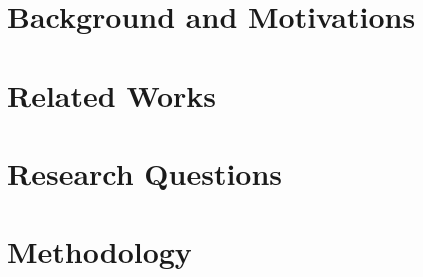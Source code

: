 \documentclass{Configuration_Files/PoliMi3i_thesis}
\begin{document}

\thispagestyle{empty}
\tableofcontents %
\thispagestyle{empty}
\cleardoublepage

%
%
%    
%

\mainmatter %

\chapter{Background and Motivations}\label{ch:background}


\chapter{Related Works}\label{ch:related_works}


\chapter{Research Questions}\label{ch:research_questions}


\chapter{Methodology}\label{ch:methodology}

\end{document}

